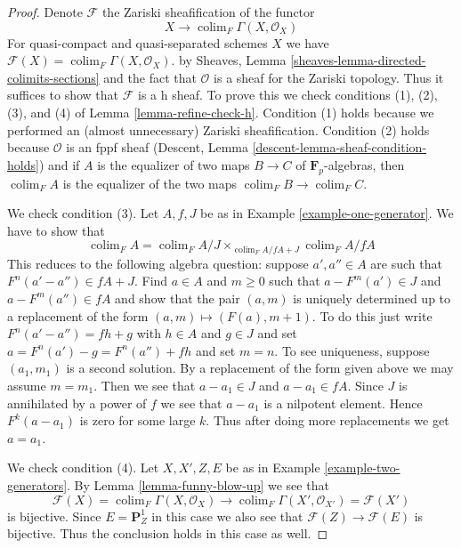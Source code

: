 \documentclass[10pt,a4paper]{amsart}
\theoremstyle{plain}
\theoremstyle{definition}
\theoremstyle{remark}
\numberwithin{equation}{subsection}
\def\colim{\mathop{\mathrm{colim}}\nolimits}
\begin{document}
\begin{proof}
Denote $\mathcal{F}$ the Zariski sheafification
of the functor
$$
X \longrightarrow \colim_F \Gamma(X, \mathcal{O}_X)
$$
For quasi-compact and quasi-separated schemes $X$
we have $\mathcal{F}(X) = \colim_F \Gamma(X, \mathcal{O}_X)$.
by Sheaves, Lemma \ref{sheaves-lemma-directed-colimits-sections}
and the fact that $\mathcal{O}$ is a sheaf for the Zariski topology.
Thus it suffices to show that $\mathcal{F}$ is a h sheaf.
To prove this we check conditions (1), (2), (3), and (4) of
Lemma \ref{lemma-refine-check-h}.
Condition (1) holds because we performed an (almost unnecessary)
Zariski sheafification. Condition (2) holds because
$\mathcal{O}$ is an fppf sheaf (Descent, Lemma
\ref{descent-lemma-sheaf-condition-holds}) and if
$A$ is the equalizer of two maps $B \to C$ of $\mathbf{F}_p$-algebras,
then $\colim_F A$ is the equalizer of the two maps
$\colim_F B \to \colim_F C$.

\medskip\noindent
We check condition (3). Let $A, f, J$ be as in
Example \ref{example-one-generator}.
We have to show that
$$
\colim_F A = \colim_F A/J \times_{\colim_F A/fA + J} \colim_F A/fA
$$
This reduces to the following algebra question: suppose $a', a'' \in A$
are such that $F^n(a' - a'') \in fA + J$. Find $a \in A$ and $m \geq 0$
such that $a - F^m(a') \in J$ and $a - F^m(a'') \in fA$ and show that
the pair $(a, m)$ is uniquely determined up to a replacement of the
form $(a, m) \mapsto (F(a), m + 1)$.
To do this just write $F^n(a' - a'') = f h + g$ with $h \in A$ and $g \in J$
and set $a = F^n(a') - g = F^n(a'') + fh$ and set $m = n$.
To see uniqueness, suppose $(a_1, m_1)$ is a second solution.
By a replacement of the form given above we may assume $m = m_1$.
Then we see that $a - a_1 \in J$ and $a - a_1 \in fA$.
Since $J$ is annihilated by a power of $f$ we see that
$a - a_1$ is a nilpotent element. Hence $F^k(a - a_1)$ is zero
for some large $k$. Thus after doing more replacements we get
$a = a_1$.

\medskip\noindent
We check condition (4). Let $X, X', Z, E$ be as in
Example \ref{example-two-generators}. By
Lemma \ref{lemma-funny-blow-up} we see that
$$
\mathcal{F}(X) = \colim_F \Gamma(X, \mathcal{O}_X)
\longrightarrow
\colim_F \Gamma(X', \mathcal{O}_{X'}) = \mathcal{F}(X')
$$
is bijective. Since $E = \mathbf{P}^1_Z$ in this case we also
see that $\mathcal{F}(Z) \to \mathcal{F}(E)$ is bijective.
Thus the conclusion holds in this case as well.
\end{proof}
\end{document}
